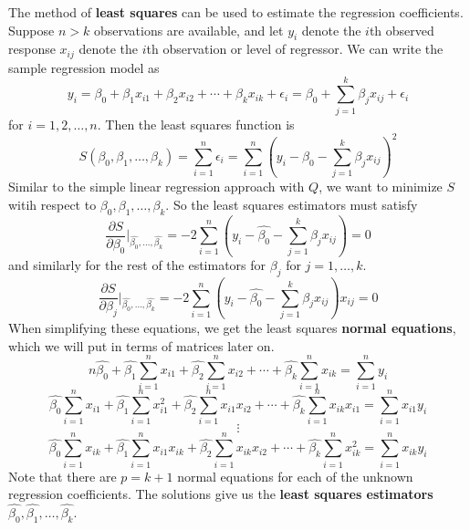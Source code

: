 The method of \textbf{least squares} can be used to estimate the regression coefficients. Suppose $n > k$ observations are available, and let $y_i$ denote the $i$th observed response $x_{ij}$ denote the $i$th observation or level of regressor. We can write the sample regression model as 
\[y_i = \beta_0 + \beta_{1}x_{i1} + \beta_2x_{i2} + \cdots + \beta_kx_{ik} + \epsilon_i = \beta_0 + \sum_{j=1}^k \beta_jx_{ij} + \epsilon_i\]
for $i = 1, 2, \ldots, n$. Then the least squares function is  
\[S(\beta_0, \beta_1, \ldots, \beta_k) = \sum_{i=1}^n \epsilon_i = \sum_{i=1}^n\left(y_i - \beta_0 - \sum_{j=1}^k \beta_jx_{ij}\right)^2\]
Similar to the simple linear regression approach with $Q$, we want to minimize $S$ witih respect to $\beta_0, \beta_1,\ldots, \beta_k$. So the least squares estimators must satisfy 
\[\frac{\partial S}{\partial \beta_0}\bigg\vert_{\hat{\beta_0}, \ldots, \hat{\beta_k}} = -2\sum_{i=1}^n \left(y_i - \hat{\beta_0} - \sum_{j=1}^k \beta_jx_{ij}\right) = 0\]
and similarly for the rest of the estimators for $\beta_j$ for $j = 1, \ldots, k$. 
\[\frac{\partial S}{\partial \beta_j}\bigg\vert_{\hat{\beta_0}, \ldots, \hat{\beta_k}} = -2\sum_{i=1}^n \left(y_i - \hat{\beta_0} - \sum_{j=1}^k \beta_jx_{ij}\right)x_{ij} = 0\]
When simplifying these equations, we get the least squares \textbf{normal equations}, which we will put in terms of matrices later on. 
\[n\hat{\beta_0} + \hat{\beta_1}\sum_{i=1}^n x_{i1} + \hat{\beta_2}\sum_{i=1}^n x_{i2} + \cdots + \hat{\beta_k}\sum_{i=1}^n x_{ik} = \sum_{i=1}^n y_i\]
\[\hat{\beta_0}\sum_{i=1}^n x_{i1} + \hat{\beta_1}\sum_{i=1}^n x_{i1}^2 + \hat{\beta_2}\sum_{i=1}^n x_{i1}x_{i2} + \cdots + \hat{\beta_k}\sum_{i=1}^n x_{ik}x_{i1} = \sum_{i=1}^n x_{i1}y_i\]
\[\vdots\]
\[\hat{\beta_0}\sum_{i=1}^n x_{ik} + \hat{\beta_1}\sum_{i=1}^n x_{i1}x_{ik}+ \hat{\beta_2}\sum_{i=1}^n x_{ik}x_{i2} + \cdots + \hat{\beta_k}\sum_{i=1}^n x_{ik}^2 = \sum_{i=1}^n x_{ik}y_i\]
Note that there are $p = k+1$ normal equations for each of the unknown regression coefficients. The solutions give us the \textbf{least squares estimators} $\hat{\beta_0}, \hat{\beta_1}, \ldots, \hat{\beta_k}$.

